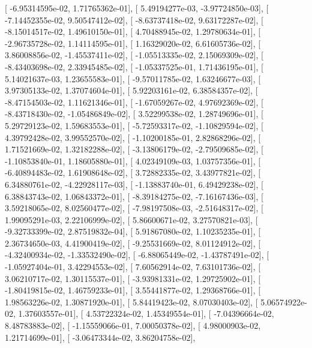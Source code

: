 \documentclass{article}
\begin{document}
       [ -6.95314595e-02,   1.71765362e-01],
       [  5.49194277e-03,  -3.97724850e-03],
       [ -7.14452355e-02,   9.50547412e-02],
       [ -8.63737418e-02,   9.63172287e-02],
       [ -8.15014517e-02,   1.49610150e-01],
       [  4.70488945e-02,   1.29780634e-01],
       [ -2.96735728e-02,   1.14114595e-01],
       [  1.16329020e-02,   6.61605736e-02],
       [  3.86008856e-02,  -1.45537411e-02],
       [ -1.05513335e-02,   2.15069309e-02],
       [ -8.43403698e-02,   2.33945485e-02],
       [ -1.05337525e-01,   1.71436195e-01],
       [  5.14021637e-03,   1.23655583e-01],
       [ -9.57011785e-02,   1.63246677e-03],
       [  3.97305133e-02,   1.37074604e-01],
       [  5.92203161e-02,   6.38584357e-02],
       [ -8.47154503e-02,   1.11621346e-01],
       [ -1.67059267e-02,   4.97692369e-02],
       [ -8.43718430e-02,  -1.05486849e-02],
       [  3.52299538e-02,   1.28749696e-01],
       [  5.29729123e-02,   1.59683553e-01],
       [ -5.72593317e-02,  -1.10829594e-02],
       [  4.39792428e-02,   3.99552570e-02],
       [ -1.10200185e-01,   2.82868296e-02],
       [  1.71521669e-02,   1.32182288e-02],
       [ -3.13806179e-02,  -2.79509685e-02],
       [ -1.10853840e-01,   1.18605880e-01],
       [  4.02349109e-03,   1.03757356e-01],
       [ -6.40894483e-02,   1.61908648e-02],
       [  3.72882335e-02,   3.43977821e-02],
       [  6.34880761e-02,  -4.22928117e-03],
       [ -1.13883740e-01,   6.49429238e-02],
       [  6.38843743e-02,   1.06843372e-01],
       [ -8.39184275e-02,  -7.16167436e-03],
       [  3.59218065e-02,   8.02560477e-02],
       [ -7.98197508e-03,  -2.51648317e-02],
       [  1.99095291e-03,   2.22106999e-02],
       [  5.86600671e-02,   3.27570821e-03],
       [ -9.32733399e-02,   2.87519832e-04],
       [  5.91867080e-02,   1.10235235e-01],
       [  2.36734650e-03,   4.41900419e-02],
       [ -9.25531669e-02,   8.01124912e-02],
       [ -4.32400934e-02,  -1.33532490e-02],
       [ -6.88065449e-02,  -1.43787491e-02],
       [ -1.05927404e-01,   3.42294553e-02],
       [  7.60562914e-02,   7.63101736e-02],
       [  3.06210717e-02,   1.30115537e-01],
       [ -3.93981331e-02,   1.29725902e-01],
       [ -1.80419815e-02,   1.46759233e-01],
       [  3.55441877e-02,   1.29368766e-01],
       [  1.98563226e-02,   1.30871920e-01],
       [  5.84419423e-02,   8.07030403e-02],
       [  5.06574922e-02,   1.37603557e-01],
       [  4.53722324e-02,   1.45349554e-01],
       [ -7.04396664e-02,   8.48783883e-02],
       [ -1.15559066e-01,   7.00050378e-02],
       [  4.98000903e-02,   1.21714699e-01],
       [ -3.06473344e-02,   3.86204758e-02],
\end{document}
